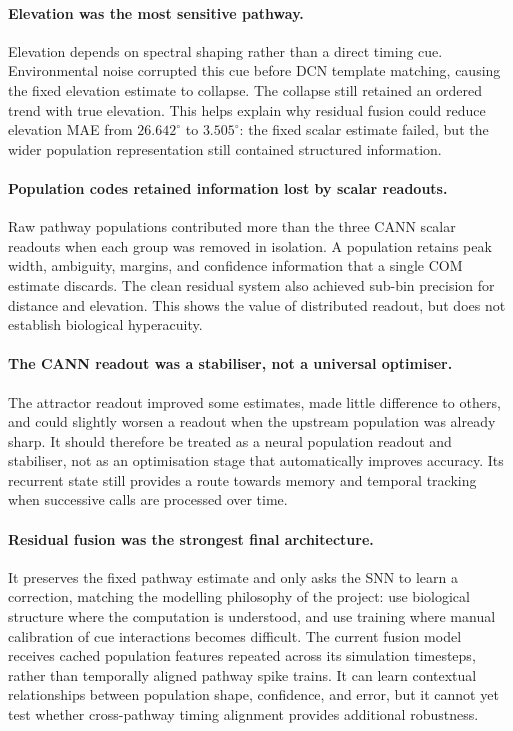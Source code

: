 \paragraph{Elevation was the most sensitive pathway.} Elevation depends on spectral shaping rather than a direct timing cue. Environmental noise corrupted this cue before DCN template matching, causing the fixed elevation estimate to collapse. The collapse still retained an ordered trend with true elevation. This helps explain why residual fusion could reduce elevation MAE from $26.642^\circ$ to $3.505^\circ$: the fixed scalar estimate failed, but the wider population representation still contained structured information.

\paragraph{Population codes retained information lost by scalar readouts.} Raw pathway populations contributed more than the three CANN scalar readouts when each group was removed in isolation. A population retains peak width, ambiguity, margins, and confidence information that a single COM estimate discards. The clean residual system also achieved sub-bin precision for distance and elevation. This shows the value of distributed readout, but does not establish biological hyperacuity.

\paragraph{The CANN readout was a stabiliser, not a universal optimiser.} The attractor readout improved some estimates, made little difference to others, and could slightly worsen a readout when the upstream population was already sharp. It should therefore be treated as a neural population readout and stabiliser, not as an optimisation stage that automatically improves accuracy. Its recurrent state still provides a route towards memory and temporal tracking when successive calls are processed over time.

\paragraph{Residual fusion was the strongest final architecture.} It preserves the fixed pathway estimate and only asks the SNN to learn a correction, matching the modelling philosophy of the project: use biological structure where the computation is understood, and use training where manual calibration of cue interactions becomes difficult. The current fusion model receives cached population features repeated across its simulation timesteps, rather than temporally aligned pathway spike trains. It can learn contextual relationships between population shape, confidence, and error, but it cannot yet test whether cross-pathway timing alignment provides additional robustness.

